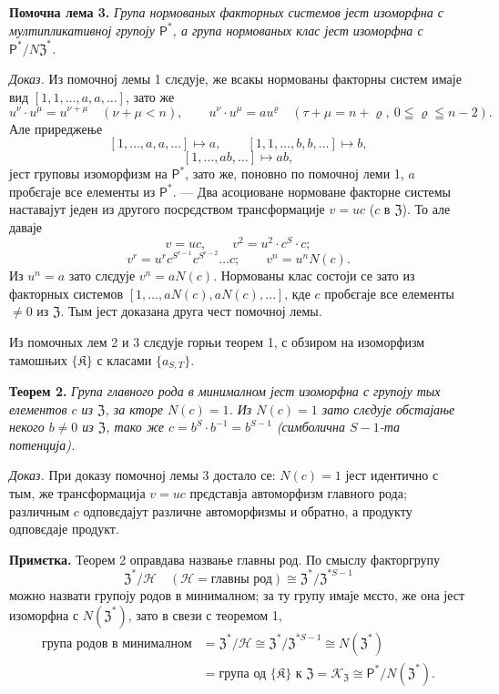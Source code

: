 \documentclass[11pt]{article}
\begin{document}
\noindent\textbf{Помочна лема 3.} \emph{Група нормованых факторных системов јест изоморфна с мултипликативној групоју \(\mathsf{P}^*\), а група нормованых клас јест изоморфна с \(\mathsf{P}^*/N\mathfrak Z^*\).}

\noindent\emph{Доказ.} Из помочној лемы 1 слєдује, же всакы нормованы факторны систем имаје вид \([1,1,\ldots,a,a,\ldots]\), зато же
\[
u^\nu\cdot u^\mu=u^{\nu+\mu}\quad(\nu+\mu<n),
\qquad
u^\nu\cdot u^\mu=au^\varrho\quad(\tau+\mu=n+\varrho,\ 0\leqq\varrho\leqq n-2).
\]
Але приреджење
\[
[1,\ldots,a,a,\ldots]\mapsto a,
\qquad
[1,1,\ldots,b,b,\ldots]\mapsto b,
\]
\[
[1,\ldots,ab,\ldots]\mapsto ab,
\]
јест груповы изоморфизм на \(\mathsf{P}^*\), зато же, поновно по помочној леми 1, \(a\) пробєгаје все елементы из \(\mathsf{P}^*\). --- Два асоциоване нормоване факторне системы наставајут једен из другого посрєдством трансформације \(v=uc\) (\(c\) в \(\mathfrak Z\)). То але даваје
\[
v=uc,\qquad v^2=u^2\cdot c^S\cdot c;
\]
\[
v^r=u^r c^{S^{r-1}}c^{S^{r-2}}\ldots c;
\qquad
v^n=u^nN(c).
\]
Из \(u^n=a\) зато слєдује \(v^n=aN(c)\). Нормованы клас состоји се зато из факторных системов \([1,\ldots,aN(c),aN(c),\ldots]\), кде \(c\) пробєгаје все елементы \(\neq0\) из \(\mathfrak Z\). Тым јест доказана друга чест помочној лемы.

Из помочных лем 2 и 3 слєдује горњи теорем 1, с обзиром на изоморфизм тамошњих \(\{\mathfrak K\}\) с класами \(\{a_{S,T}\}\).

\noindent\textbf{Теорем 2.} \emph{Група главного рода в минималном јест изоморфна с групоју тых елементов \(c\) из \(\mathfrak Z\), за кторе \(N(c)=1\). Из \(N(c)=1\) зато слєдује обстајање некого \(b\neq0\) из \(\mathfrak Z\), тако же \(c=b^S\cdot b^{-1}=b^{S-1}\) (симболична \(S-1\)-та потенција).}

\noindent\emph{Доказ.} При доказу помочној лемы 3 достало се: \(N(c)=1\) јест идентично с тым, же трансформација \(v=uc\) прєдставја автоморфизм главного рода; различным \(c\) одповєдајут различне автоморфизмы и обратно, а продукту одповєдаје продукт.

\noindent\textbf{Примєтка.} Теорем 2 оправдава назвање главны род. По смыслу факторгрупу
\[
\mathfrak Z^*/\mathscr H
\quad(\mathscr H=\text{главны род})
\cong\mathfrak Z^*/\mathfrak Z^{*S-1}
\]
можно назвати групоју родов в минималном; за ту групу имаје мєсто, же она јест изоморфна с \(N(\mathfrak Z^*)\), зато в свези с теоремом 1,
\[
\begin{aligned}
\text{група родов в минималном}
&=\mathfrak Z^*/\mathscr H
 \cong\mathfrak Z^*/\mathfrak Z^{*S-1}
 \cong N(\mathfrak Z^*)\\
&=\text{група од }\{\mathfrak K\}\text{ к }\mathfrak Z
 =\mathscr K_{\mathfrak Z}
 \cong \mathsf{P}^*/N(\mathfrak Z^*).
\end{aligned}
\]
\end{document}
